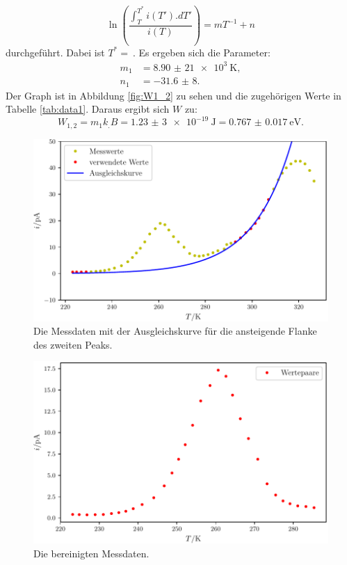 \begin{equation}
\ln\left(\frac{\int_T^{T^*} i(T').dT'}{i(T)}\right) = mT^{-1}+n \label{eq:reg3}
\end{equation}
durchgeführt. Dabei ist $T^*=\SI{}{}$. Es ergeben sich die Parameter:
\begin{align*}
m_1&=\SI{8,90(21)e3}{\kelvin},\\
n_1&=\num{-31,6(8)}\text{.}
\end{align*}
Der Graph ist in Abbildung \ref{fig:W1_2} zu sehen und die zugehörigen Werte in Tabelle \ref{tab:data1}.
Daraus ergibt sich $W$ zu:
\[
W_{1,2} = m_1 k_.B =\SI{1,23(3)e-19}{\joule}=\SI{0.767(17)}{\electronvolt}\text{.}
\]

\begin{figure}
	\centering
	\includegraphics[width=\linewidth-60pt,height=\textheight-60pt,keepaspectratio]{content/images/plot1exp.pdf}
	\caption{Die Messdaten mit der Ausgleichskurve für die ansteigende Flanke des zweiten Peaks.}
	\label{fig:plot1exp}
\end{figure}

\begin{figure}
	\centering
	\includegraphics[width=\linewidth-60pt,height=\textheight-60pt,keepaspectratio]{content/images/bereinigt1.pdf}
	\caption{Die bereinigten Messdaten.}
	\label{fig:bereinigt1}
\end{figure}

